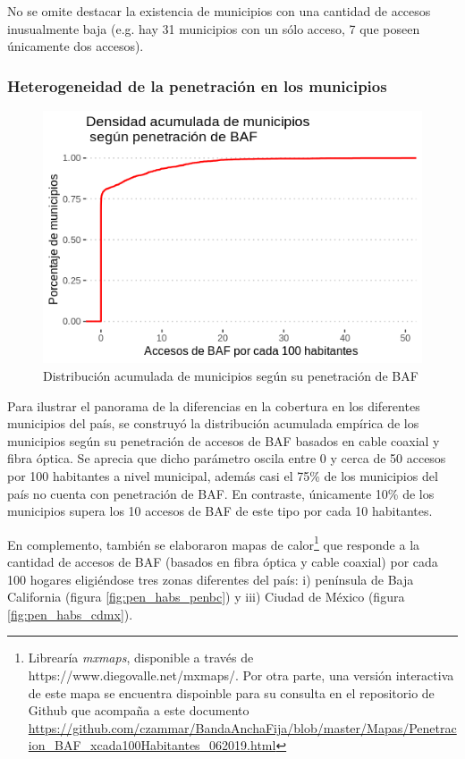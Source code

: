 \documentclass[9pt,twocolumn,twoside]{ilcss}
\begin{document}
No se omite destacar la existencia de municipios con una cantidad de accesos inusualmente baja (e.g. hay 31 municipios con un sólo acceso, 7 que poseen únicamente dos accesos).

\subsubsection{Heterogeneidad de la penetración en los municipios}

\begin{figure}[tbhp]
	\centering
	\includegraphics[width=0.9\linewidth]{images/cumulative_dens_pen.png}
	\caption{Distribución acumulada de municipios según su penetración de BAF}
	\label{fig:cumulative}
\end{figure}

Para ilustrar el panorama de la diferencias en la cobertura en los diferentes municipios del país, se construyó la distribución acumulada empírica de los municipios según su penetración de accesos de BAF basados en cable coaxial y fibra óptica. Se aprecia que dicho parámetro oscila entre 0 y cerca de 50 accesos por 100 habitantes a nivel municipal, además casi el 75\% de los municipios del país no cuenta con penetración de BAF. En contraste, únicamente 10\% de los municipios supera los 10 accesos de BAF de este tipo por cada 10 habitantes.

En complemento, también se elaboraron mapas de calor\footnote{Librearía \emph{mxmaps}, disponible a través de https://www.diegovalle.net/mxmaps/. Por otra parte, una versión interactiva de este mapa se encuentra dispoinble para su consulta en el repositorio de Github que acompaña a este documento \url{https://github.com/czammar/BandaAnchaFija/blob/master/Mapas/Penetracion_BAF_xcada100Habitantes_062019.html}} que responde a la cantidad de accesos de BAF (basados en fibra óptica y cable coaxial) por cada 100 hogares eligiéndose tres zonas diferentes del país: i) península de Baja California (figura \ref{fig:pen_habs_penbc}) y iii) Ciudad de México (figura \ref{fig:pen_habs_cdmx}).
\end{document}
